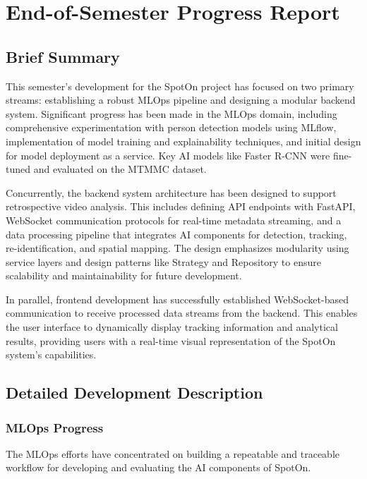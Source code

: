 \chapter*{End-of-Semester Progress Report} %
\label{chap:progress_report}

\section*{Brief Summary}
\label{sec:progress_summary}
This semester's development for the SpotOn project has focused on two primary streams: establishing a robust MLOps pipeline and designing a modular backend system. Significant progress has been made in the MLOps domain, including comprehensive experimentation with person detection models using MLflow, implementation of model training and explainability techniques, and initial design for model deployment as a service. Key AI models like Faster R-CNN were fine-tuned and evaluated on the MTMMC dataset.

Concurrently, the backend system architecture has been designed to support retrospective video analysis. This includes defining API endpoints with FastAPI, WebSocket communication protocols for real-time metadata streaming, and a data processing pipeline that integrates AI components for detection, tracking, re-identification, and spatial mapping. The design emphasizes modularity using service layers and design patterns like Strategy and Repository to ensure scalability and maintainability for future development.

In parallel, frontend development has successfully established WebSocket-based communication to receive processed data streams from the backend. This enables the user interface to dynamically display tracking information and analytical results, providing users with a real-time visual representation of the SpotOn system's capabilities.


\section*{Detailed Development Description}
\label{sec:progress_detailed_development}

\subsection*{MLOps Progress}
\label{subsec:progress_mlops}
The MLOps efforts have concentrated on building a repeatable and traceable workflow for developing and evaluating the AI components of SpotOn.

